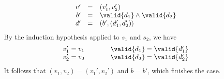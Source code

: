 {\begin{description}
\[\begin{array}{rcl}
v' &=& (v_1',v_2')\\
b' &= & \valid{d_1} \wedge \valid{d_2}\\
d' &=& (b',(d_1',d_2'))\\
\end{array}
\]
%
By the induction hypothesis applied to $s_1$ and $s_2$, we have 
\[
\begin{array}{l}
v_1' = v_1\\
v_2' = v_2\\
\end{array}\hspace*{1cm}\begin{array}{l}
\valid{d_1} = \valid{d_1'}\\
\valid{d_2} = \valid{d_2'}\\
\end{array}
\]
It follows that $(v_1,v_2) = (v_1',v_2')$ and $b = b'$, which
finishes the case.


\end{description}}
